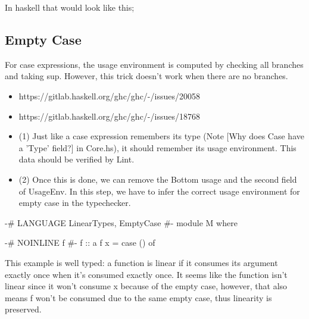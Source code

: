 \documentclass[a4paper, draft]{article}
\begin{document}
In haskell that would look like this;


\subsection{Empty Case}

For case expressions, the usage environment is computed by checking all branches
and taking sup. However, this trick doesn't work when there are no branches.

\begin{itemize}
\item https://gitlab.haskell.org/ghc/ghc/-/issues/20058
\item https://gitlab.haskell.org/ghc/ghc/-/issues/18768

\item (1) Just like a case expression remembers its type (Note [Why does Case have a
'Type' field?] in Core.hs), it should remember its usage environment. This data
should be verified by Lint.

\item (2) Once this is done, we can remove the Bottom usage and the second field of
UsageEnv. In this step, we have to infer the correct usage environment for empty
case in the typechecker.
\end{itemize}

\begin{code}
{-# LANGUAGE LinearTypes, EmptyCase #-}
module M where

{-# NOINLINE f #-}
f :: a %
f x = case () of {}
\end{code}

This example is well typed: a function is linear if it consumes its argument
exactly once when it's consumed exactly once. It seems like the function isn't
linear since it won't consume x because of the empty case, however, that also
means f won't be consumed due to the same empty case, thus linearity is
preserved.
\end{document}
